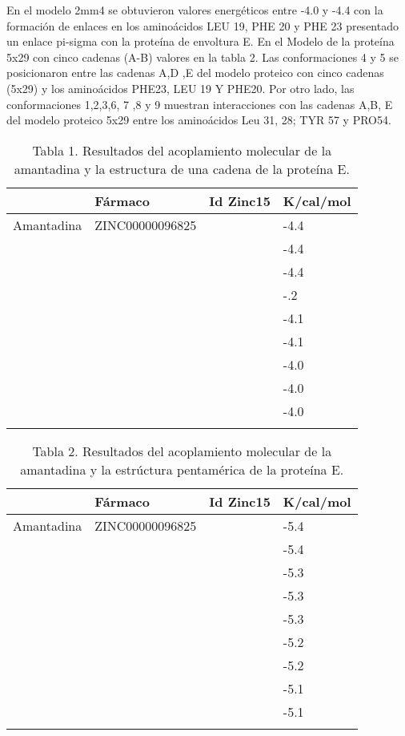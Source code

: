 \documentclass[12pt]{article}
\begin{document}
En el modelo 2mm4 se obtuvieron valores energéticos entre -4.0 y -4.4 con la formación de enlaces en los aminoácidos LEU 19, PHE 20 y PHE 23 presentado un enlace pi-sigma con la proteína de envoltura E. En el Modelo de la proteína 5x29 con cinco cadenas (A-B) valores en la tabla 2. Las conformaciones 4 y 5 se posicionaron entre las cadenas A,D ,E del modelo proteico con cinco cadenas (5x29) y los aminoácidos PHE23, LEU 19 Y PHE20. Por otro lado, las conformaciones 1,2,3,6, 7 ,8 y 9 muestran interacciones con las cadenas A,B, E del modelo proteico 5x29 entre los aminoácidos Leu 31, 28; TYR 57 y PRO54.
\begin{table}[h]\centering
\caption{Tabla 1. Resultados del acoplamiento molecular de la amantadina y la estructura de una cadena de la proteína E.}
\begin{tabular}{L{.7in}C{.7in}C{.7in}C{.7in}}\toprule
 & Fármaco & Id Zinc15 & K/cal/mol\\\midrule
Amantadina   
& ZINC00000096825 &  & -4.4 \\ &   &  & -4.4\\  &   &  & -4.4\\ &   &  & -.2\\ &   &  & -4.1\\ &   &  & -4.1\\ &   &  & -4.0\\ &   &  & -4.0\\ &   &  & -4.0\\
 \\\bottomrule



\end{tabular}
\end{table}

\begin{table}[h]\centering
\caption{Tabla 2. Resultados del acoplamiento molecular de la amantadina y la estrúctura pentamérica de la proteína E.}
\begin{tabular}{L{.7in}C{.7in}C{.7in}C{.7in}}\toprule
 & Fármaco & Id Zinc15 & K/cal/mol\\\midrule
Amantadina   
& ZINC00000096825 &  & -5.4 \\ &   &  & -5.4\\  &   &  & -5.3\\ &   &  & -5.3\\ &   &  & -5.3\\ &   &  & -5.2\\ &   &  & -5.2\\ &   &  & -5.1\\ &   &  & -5.1\\
 \\\bottomrule
 
 

\end{tabular}
\end{table}
\end{document}
